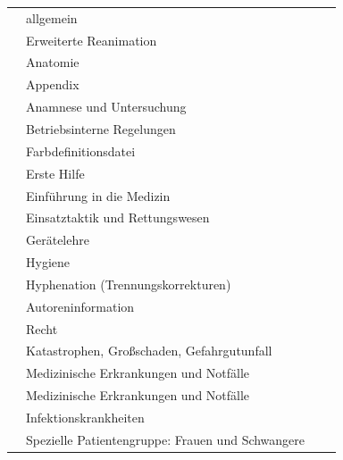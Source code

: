 \documentclass[ngerman,paper=a4,fontsize=8pt,headings=small,draft=no,parskip=half,noonelinecaption]{scrreprt}
\begin{document}
\begin{tabulary}{\linewidth}{cLlL}\toprule
\noindent{} 
& 
\noindent{} 
& 
\noindent{}
& 
\noindent{}
\\\midrule
{} &  \noindent\AASS{} allgemein  & & 
\\\addlinespace
{} & Erweiterte Reanimation &  &
\\\addlinespace
{} & Anatomie &  &
\\\addlinespace
{} & Appendix &  \caps{---} &
\\\addlinespace
{} & Anamnese und Untersuchung &   &
\\\addlinespace
{} & Betriebsinterne Regelungen &  \caps{---} &
\\\addlinespace
{} &  Farbdefinitionsdatei &  \caps{---} &
\\\addlinespace
{} & Erste Hilfe &   &
\\\addlinespace
{} & Einführung in die Medizin &   &
\\\addlinespace
{} & Einsatztaktik und Rettungswesen &  &
\\\addlinespace
{} & Gerätelehre &   &
\\\addlinespace
{} & Hygiene &   &
\\\addlinespace
{} &  Hyphenation (Trennungskorrekturen) &  \caps{---} &
\\\addlinespace
{} & Autoreninformation &   &
\\\addlinespace
{}  & Recht &   &
\\\addlinespace
{} & Katastrophen, Großschaden, Gefahrgutunfall & 
 & 
\\\addlinespace
{} & Medizinische Erkrankungen und Notfälle & 
 & 
\\\addlinespace
{} & Medizinische Erkrankungen und Notfälle & 
 & 
\\\addlinespace
{} & Infektionskrankheiten & 
 & 
\\\addlinespace
{} & Spezielle Patientengruppe: Frauen und Schwangere & 

\end{tabulary}
\end{document}
